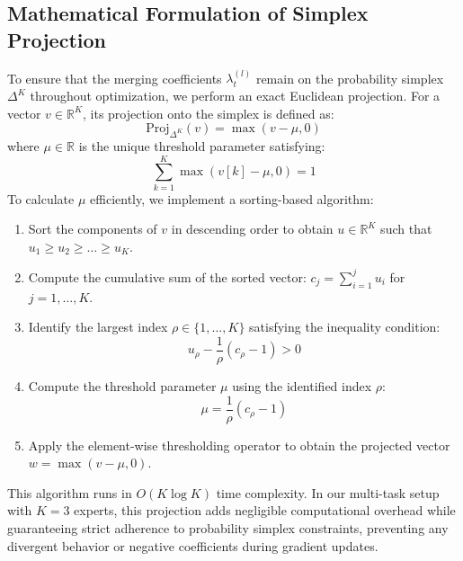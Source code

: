 \documentclass{article}
\theoremstyle{plain}
\theoremstyle{definition}
\begin{document}
\subsection{Mathematical Formulation of Simplex Projection}
To ensure that the merging coefficients $\lambda_t^{(l)}$ remain on the probability simplex $\Delta^K$ throughout optimization, we perform an exact Euclidean projection. For a vector $v \in \mathbb{R}^K$, its projection onto the simplex is defined as:
\begin{equation}
    \text{Proj}_{\Delta^K}(v) = \max(v - \mu, 0)
\end{equation}
where $\mu \in \mathbb{R}$ is the unique threshold parameter satisfying:
\begin{equation}
    \sum_{k=1}^K \max(v[k] - \mu, 0) = 1
\end{equation}
To calculate $\mu$ efficiently, we implement a sorting-based algorithm:
\begin{enumerate}
    \item Sort the components of $v$ in descending order to obtain $u \in \mathbb{R}^K$ such that $u_1 \geq u_2 \geq \dots \geq u_K$.
    \item Compute the cumulative sum of the sorted vector: $c_j = \sum_{i=1}^j u_i$ for $j = 1, \dots, K$.
    \item Identify the largest index $\rho \in \{1, \dots, K\}$ satisfying the inequality condition:
    \begin{equation}
        u_\rho - \frac{1}{\rho} \left( c_\rho - 1 \right) > 0
    \end{equation}
    \item Compute the threshold parameter $\mu$ using the identified index $\rho$:
    \begin{equation}
        \mu = \frac{1}{\rho} \left( c_\rho - 1 \right)
    \end{equation}
    \item Apply the element-wise thresholding operator to obtain the projected vector $w = \max(v - \mu, 0)$.
\end{enumerate}
This algorithm runs in $O(K \log K)$ time complexity. In our multi-task setup with $K=3$ experts, this projection adds negligible computational overhead while guaranteeing strict adherence to probability simplex constraints, preventing any divergent behavior or negative coefficients during gradient updates.
\end{document}

